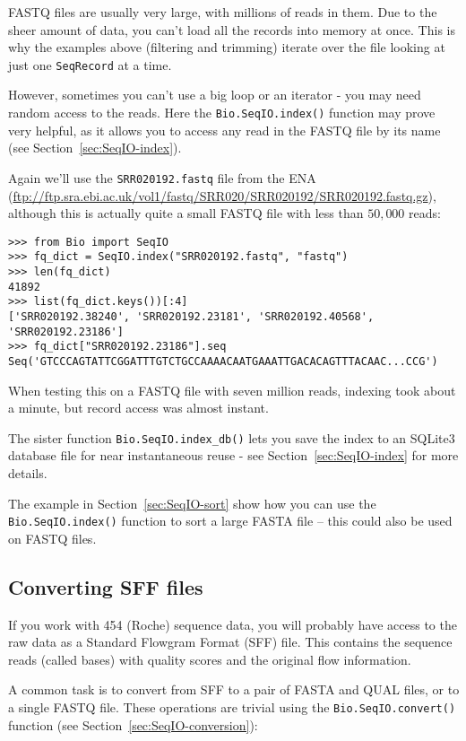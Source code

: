 FASTQ files are usually very large, with millions of reads in them. Due to the
sheer amount of data, you can't load all the records into memory at once.
This is why the examples above (filtering and trimming) iterate over the file
looking at just one \verb|SeqRecord| at a time.

However, sometimes you can't use a big loop or an iterator - you may need
random access to the reads. Here the \verb|Bio.SeqIO.index()| function
may prove very helpful, as it allows you to access any read in the FASTQ file
by its name (see Section~\ref{sec:SeqIO-index}).

Again we'll use the \texttt{SRR020192.fastq} file from the ENA
(\url{ftp://ftp.sra.ebi.ac.uk/vol1/fastq/SRR020/SRR020192/SRR020192.fastq.gz}),
although this is actually quite a small FASTQ file with less than $50,000$ reads:

\begin{verbatim}
>>> from Bio import SeqIO
>>> fq_dict = SeqIO.index("SRR020192.fastq", "fastq")
>>> len(fq_dict)
41892
>>> list(fq_dict.keys())[:4]
['SRR020192.38240', 'SRR020192.23181', 'SRR020192.40568', 'SRR020192.23186']
>>> fq_dict["SRR020192.23186"].seq
Seq('GTCCCAGTATTCGGATTTGTCTGCCAAAACAATGAAATTGACACAGTTTACAAC...CCG')
\end{verbatim}

When testing this on a FASTQ file with seven million reads,
indexing took about a minute, but record access was almost instant.

The sister function \verb|Bio.SeqIO.index_db()| lets you save the index
to an SQLite3 database file for near instantaneous reuse - see
Section~\ref{sec:SeqIO-index} for more details.

The example in Section~\ref{sec:SeqIO-sort} show how you can use the
\verb|Bio.SeqIO.index()| function to sort a large FASTA file -- this
could also be used on FASTQ files.

\subsection{Converting SFF files}
\label{sec:SeqIO-sff-conversion}

If you work with 454 (Roche) sequence data, you will probably have access
to the raw data as a Standard Flowgram Format (SFF) file. This contains
the sequence reads (called bases) with quality scores and the original
flow information.

A common task is to convert from SFF to a pair of FASTA and QUAL files,
or to a single FASTQ file. These operations are trivial using the
\verb|Bio.SeqIO.convert()| function (see Section~\ref{sec:SeqIO-conversion}):

